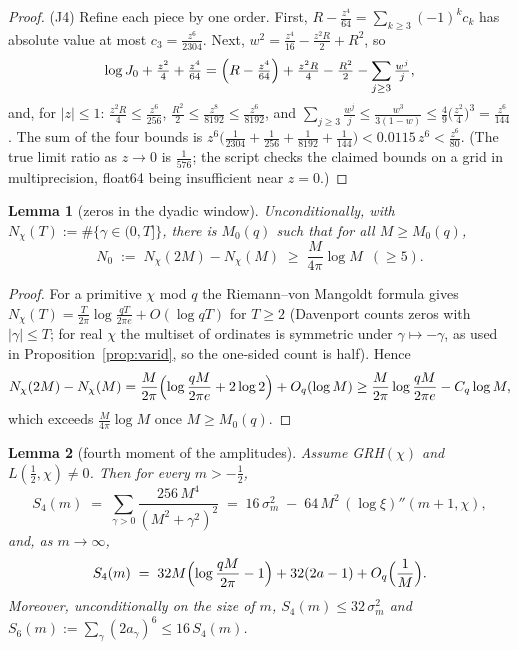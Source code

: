 \documentclass[11pt]{article}
\newtheorem{lemma}{Lemma}
\begin{document}
\begin{proof}
(J4) Refine each piece by one order. First,
$R-\tfrac{z^4}{64}=\sum_{k\ge3}(-1)^kc_k$ has absolute value at most
$c_3=\tfrac{z^6}{2304}$. Next,
$w^2=\tfrac{z^4}{16}-\tfrac{z^2R}2+R^2$, so
\[
\log J_0+\tfrac{z^2}4+\tfrac{z^4}{64}
=\Bigl(R-\tfrac{z^4}{64}\Bigr)+\tfrac{z^2R}4-\tfrac{R^2}2
-\sum_{j\ge3}\tfrac{w^j}j ,
\]
and, for $|z|\le1$: $\tfrac{z^2R}4\le\tfrac{z^6}{256}$,
$\tfrac{R^2}2\le\tfrac{z^8}{8192}\le\tfrac{z^6}{8192}$, and
$\sum_{j\ge3}\tfrac{w^j}j\le\tfrac{w^3}{3(1-w)}
\le\tfrac49\bigl(\tfrac{z^2}4\bigr)^3=\tfrac{z^6}{144}$. The sum of
the four bounds is
$z^6\bigl(\tfrac1{2304}+\tfrac1{256}+\tfrac1{8192}+\tfrac1{144}\bigr)
<0.0115\,z^6<\tfrac{z^6}{80}$. (The true limit ratio as $z\to0$ is
$\tfrac1{576}$; the script checks the claimed bounds on a grid in
multiprecision, float64 being insufficient near $z=0$.)
\end{proof}

\begin{lemma}[zeros in the dyadic window]\label{lem:window}
Unconditionally, with
$N_\chi(T):=\#\{\gamma\in(0,T]\}$, there is $M_0(q)$ such that for all
$M\ge M_0(q)$,
\[
N_0\;:=\;N_\chi(2M)-N_\chi(M)\;\ge\;\frac{M}{4\pi}\log M
\;\ (\ge5).
\]
\end{lemma}

\begin{proof}
For a primitive $\chi$ mod $q$ the Riemann--von Mangoldt formula gives
$N_\chi(T)=\frac{T}{2\pi}\log\frac{qT}{2\pi e}+O(\log qT)$ for
$T\ge2$ \cite[\S16]{Dav00} (Davenport counts zeros with $|\gamma|\le
T$; for real $\chi$ the multiset of ordinates is symmetric under
$\gamma\mapsto-\gamma$, as used in Proposition~\ref{prop:varid}, so
the one-sided count is half). Hence
\[
N_\chi(2M)-N_\chi(M)
=\frac{M}{2\pi}\Bigl(\log\frac{qM}{2\pi e}+2\log2\Bigr)+O_q(\log M)
\ge\frac{M}{2\pi}\log\frac{qM}{2\pi e}-C_q\log M ,
\]
which exceeds $\frac{M}{4\pi}\log M$ once $M\ge M_0(q)$.
\end{proof}

\begin{lemma}[fourth moment of the amplitudes]\label{lem:S4mom}
Assume GRH$(\chi)$ and $L(\tfrac12,\chi)\ne0$. Then for every
$m>-\tfrac12$,
\begin{equation}\label{eq:S4id}
S_4(m)\;=\;\sum_{\gamma>0}\frac{256\,M^4}{(M^2+\gamma^2)^2}
\;=\;16\,\sigma_m^2\;-\;64\,M^2\,(\log\xi)''(m+1,\chi),
\end{equation}
and, as $m\to\infty$,
\begin{equation}\label{eq:S4asymp}
S_4(m)\;=\;32M\Bigl(\log\frac{qM}{2\pi}-1\Bigr)+32(2a-1)
+O_q\Bigl(\frac1M\Bigr).
\end{equation}
Moreover, unconditionally on the size of $m$,
$S_4(m)\le32\,\sigma_m^2$ and
$S_6(m):=\sum_\gamma(2a_\gamma)^6\le16\,S_4(m)$.
\end{lemma}
\end{document}

